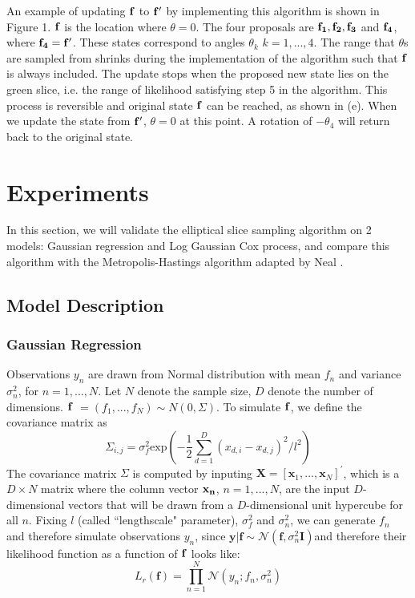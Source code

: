 \documentclass{article}
\begin{document}
An example of updating $\bf{f}$ to $\bf{f'}$ by implementing this algorithm is shown in Figure 1. $\bf{f}$ is the location where $\theta = 0$. The four proposals are $\bf{f_1}, \bf{f_2}, \bf{f_3}$ and $\bf{f_4}$, where $\bf{f_4} = \bf{f'}$. These states correspond to angles $\theta_k$ $k=1,...,4$. The range that $\theta$s are sampled from shrinks during the implementation of the algorithm such that $\bf{f}$ is always included. The update stops when the proposed new state lies on the green slice, i.e. the range of likelihood satisfying step 5 in the algorithm. This process is reversible and original state $\bf{f}$ can be reached, as shown in (e). When we update the state from $\bf{f'}$, $\theta = 0$ at this point. A rotation of $-\theta_4$ will return back to the original state.


\section{Experiments}
In this section, we will validate the elliptical slice sampling algorithm on 2 models: Gaussian regression and Log Gaussian Cox process, and compare this algorithm with the Metropolis-Hastings algorithm adapted by Neal \cite{Neal}.
  
\subsection{Model Description}
\subsubsection{Gaussian Regression}

Observations $y_n$ are drawn from Normal distribution with mean $f_n$ and variance $\sigma_n^2$, for $n = 1,...,N$. Let $N$ denote the sample size, $D$ denote the number of dimensions. $\bf{f}$ $= (f_1,...,f_N) \sim{N(0,\Sigma)}$. To simulate $\bf{f}$, we define the covariance matrix as 
\begin{equation}
\Sigma_{i,j} = \sigma_{f}^{2}\text{exp}\left(-\frac{1}{2}\sum_{d=1}^{D}(x_{d,i} - x_{d,j})^2/l^2\right)
\end{equation}
The covariance matrix $\Sigma$ is computed by inputing $\mathbf{X}=[\mathbf{x}_1,...,\mathbf{x}_N]^{'}$, which is a $D\times{N}$ matrix where the column vector $\bf{x}_n$, $n = 1,...,N$, are the input $D$-dimensional vectors that will be drawn from a $D$-dimensional unit hypercube for all $n$. 
Fixing $l$ (called ``lengthscale" parameter), $\sigma_{f}^2$ and $\sigma_{n}^2$, we can generate $f_n$ and therefore simulate observations $y_n$, since $\mathbf{y}|\mathbf{f}\sim\mathcal{N}\left(\mathbf{f},\sigma_n^2\mathbf{I}\right)$and therefore their likelihood function as a function of $\bf{f}$ looks like:
\begin{equation}
L_r(\mathbf{f}) = \prod_{n=1}^{N} \mathcal{N}(y_n;f_n,\sigma_n^2)
\end{equation}
\end{document}
